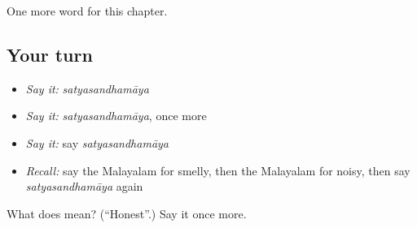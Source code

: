 \begin{grammarlens}[title={What you've built}]
One more word for this chapter.
\end{grammarlens}

\subsection*{Your turn}
\begin{itemize}
\raggedright
  \item \emph{Say it:} \emph{satyasandhamāya}
  \item \emph{Say it:} \emph{satyasandhamāya}, once more
  \item \emph{Say it:} say \emph{satyasandhamāya}
  \item \emph{Recall:} say the Malayalam for smelly, then the Malayalam for noisy, then say \emph{satyasandhamāya} again
\end{itemize}

\begin{tcolorbox}[breakable,colback=teal!4,colframe=teal!35!black,title={Before you move on}]
What does  mean? (\textquotedblleft{}Honest\textquotedblright{}.) Say it once more.
\end{tcolorbox}
